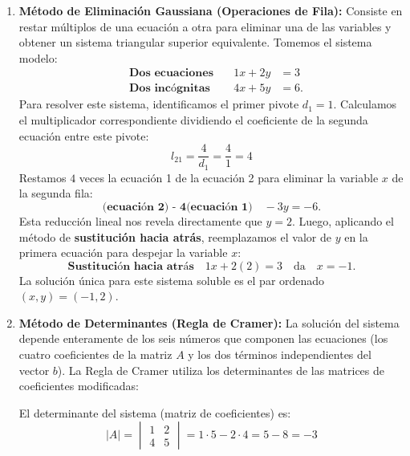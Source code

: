 \documentclass[11pt, a4paper]{article}
\begin{document}
\begin{enumerate}
    \item \textbf{Método de Eliminación Gaussiana (Operaciones de Fila):}
    Consiste en restar múltiplos de una ecuación a otra para eliminar una de las variables y obtener un sistema triangular superior equivalente. Tomemos el sistema modelo:
    \begin{equation}
    \begin{aligned}
      &\textbf{Dos ecuaciones} \quad & 1x + 2y &= 3 \\
      &\textbf{Dos incógnitas}  \quad & 4x + 5y &= 6.
    \end{aligned}
    \end{equation}
    Para resolver este sistema, identificamos el primer pivote $d_1 = 1$. Calculamos el multiplicador correspondiente dividiendo el coeficiente de la segunda ecuación entre este pivote:
    $$l_{21} = \frac{4}{d_1} = \frac{4}{1} = 4$$
    Restamos $4$ veces la ecuación 1 de la ecuación 2 para eliminar la variable $x$ de la segunda fila:
    \begin{equation}
    \textbf{(ecuación 2) - 4(ecuación 1)} \quad -3y = -6.
    \end{equation}
    Esta reducción lineal nos revela directamente que $y = 2$. Luego, aplicando el método de \textbf{sustitución hacia atrás}, reemplazamos el valor de $y$ en la primera ecuación para despejar la variable $x$:
    \begin{equation}
    \textbf{Sustitución hacia atrás} \quad 1x + 2(2) = 3 \quad \text{da} \quad x = -1.
    \end{equation}
    La solución única para este sistema soluble es el par ordenado $(x, y) = (-1, 2)$.

    \item \textbf{Método de Determinantes (Regla de Cramer):}
    La solución del sistema depende enteramente de los seis números que componen las ecuaciones (los cuatro coeficientes de la matriz $A$ y los dos términos independientes del vector $b$). La Regla de Cramer utiliza los determinantes de las matrices de coeficientes modificadas:
    
    El determinante del sistema (matriz de coeficientes) es:
    $$|A| = \begin{vmatrix} 1 & 2 \\ 4 & 5 \end{vmatrix} = 1 \cdot 5 - 2 \cdot 4 = 5 - 8 = -3$$
    

\end{enumerate}
\end{document}
